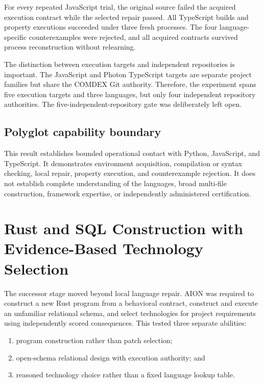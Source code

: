 For every repeated JavaScript trial, the original source failed the acquired
execution contract while the selected repair passed.  All TypeScript builds and
property executions succeeded under three fresh processes.  The four
language-specific counterexamples were rejected, and all acquired contracts
survived process reconstruction without relearning.

The distinction between execution targets and independent repositories is
important.  The JavaScript and Photon TypeScript targets are separate project
families but share the COMDEX Git authority.  Therefore, the experiment spans
five execution targets and three languages, but only four independent
repository authorities.  The five-independent-repository gate was deliberately
left open.

\subsection{Polyglot capability boundary}

This result establishes bounded operational contact with Python, JavaScript,
and TypeScript.  It demonstrates environment acquisition, compilation or syntax
checking, local repair, property execution, and counterexample rejection.  It
does not establish complete understanding of the languages, broad multi-file
construction, framework expertise, or independently administered certification.


\section{Rust and SQL Construction with Evidence-Based Technology Selection}
\label{sec:rust-sql-construction-selection}

The successor stage moved beyond local language repair.  AION was required to
construct a new Rust program from a behavioral contract, construct and execute
an unfamiliar relational schema, and select technologies for project
requirements using independently scored consequences.  This tested three
separate abilities:
\begin{enumerate}
  \item program construction rather than patch selection;
  \item open-schema relational design with execution authority; and
  \item reasoned technology choice rather than a fixed language lookup table.
\end{enumerate}

